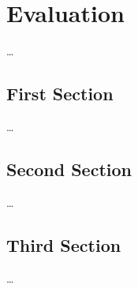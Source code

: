 
\chapter{Evaluation}
\label{ch:Evaluation}

\dots

\section{First Section}
\label{sec:Evaluation:FirstSection}

\dots

\section{Second Section}
\label{sec:Evaluation:SecondSection}

\dots

\section{Third Section}
\label{sec:Evaluation:ThirdSection}

\dots
